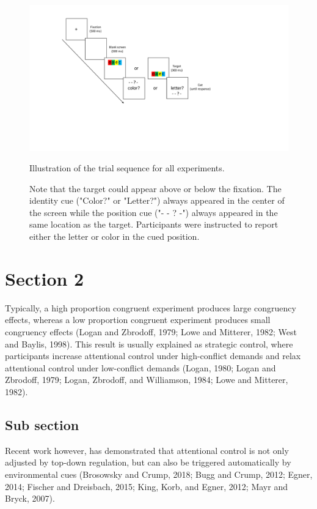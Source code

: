 \documentclass[]{DissertateCUNY}
\begin{document}
\begin{figure}
  \centering
  \includegraphics[width=5in]{figures/figure1.pdf}
  \caption{Illustration of the trial sequence for all experiments.}
  \caption*{Note that the target could appear above or below the fixation. The identity cue ("Color?" or "Letter?") always appeared in the center of the screen while the position cue ("- - ? -") always appeared in the same location as the target. Participants were instructed to report either the letter or color in the cued position.}

  \label{figure1}
\end{figure}

\section{Section 2}\label{section-2}

Typically, a high proportion congruent experiment produces large
congruency effects, whereas a low proportion congruent experiment
produces small congruency effects (Logan and Zbrodoff, 1979; Lowe and
Mitterer, 1982; West and Baylis, 1998). This result is usually explained
as strategic control, where participants increase attentional control
under high-conflict demands and relax attentional control under
low-conflict demands (Logan, 1980; Logan and Zbrodoff, 1979; Logan,
Zbrodoff, and Williamson, 1984; Lowe and Mitterer, 1982).

\subsection{Sub section}\label{sub-section}

Recent work however, has demonstrated that attentional control is not
only adjusted by top-down regulation, but can also be triggered
automatically by environmental cues (Brosowsky and Crump, 2018; Bugg and
Crump, 2012; Egner, 2014; Fischer and Dreisbach, 2015; King, Korb, and
Egner, 2012; Mayr and Bryck, 2007).
\end{document}
